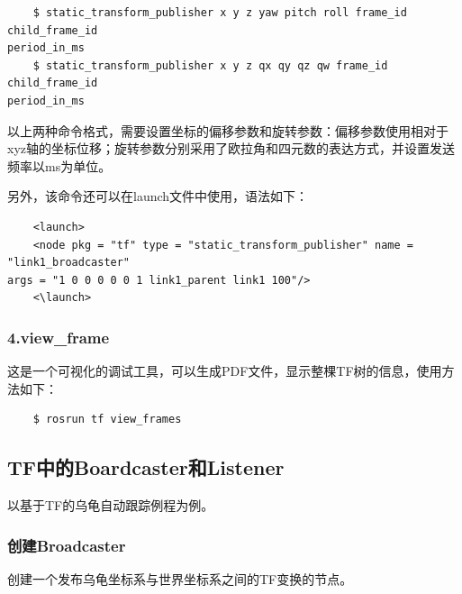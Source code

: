 \documentclass[9pt, oneside]{book}
\begin{document}
\begin{verbatim}
    $ static_transform_publisher x y z yaw pitch roll frame_id child_frame_id 
period_in_ms
    $ static_transform_publisher x y z qx qy qz qw frame_id child_frame_id 
period_in_ms
\end{verbatim}

以上两种命令格式，需要设置坐标的偏移参数和旋转参数：偏移参数使用相对于xyz轴的坐标位移；旋转参数分别采用了欧拉角和四元数的表达方式，并设置发送频率以ms为单位。

另外，该命令还可以在launch文件中使用，语法如下：

\begin{verbatim}
    <launch>
    <node pkg = "tf" type = "static_transform_publisher" name = "link1_broadcaster" 
args = "1 0 0 0 0 0 1 link1_parent link1 100"/>
    <\launch>
\end{verbatim}

\subsubsection{4.view\_frame}

这是一个可视化的调试工具，可以生成PDF文件，显示整棵TF树的信息，使用方法如下：

\begin{verbatim}
    $ rosrun tf view_frames
\end{verbatim}

\subsection{TF中的Boardcaster和Listener}

以基于TF的乌龟自动跟踪例程为例。

\subsubsection{创建Broadcaster}

创建一个发布乌龟坐标系与世界坐标系之间的TF变换的节点。
\end{document}
